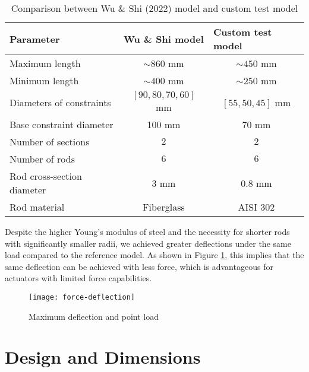 \begin{table}[h]
    \centering
    \caption{Comparison between Wu \& Shi (2022) model and custom test model}
    \label{tab:comparison}
    \begin{tabular}{lcc}
    \toprule
    Parameter                  & \multicolumn{1}{l}{Wu \& Shi model \cite{wu2022}} & \multicolumn{1}{l}{Custom test model} \\ \midrule
    Maximum length             & $\sim860$ mm                     & $\sim450$ mm                       \\
    Minimum length             & $\sim400$ mm                     & $\sim250$ mm                        \\
    Diameters of constraints   & $[90, 80, 70, 60]$ mm               & $[55, 50, 45]$ mm                     \\
    Base constraint diameter   & 100 mm                              & 70 mm                                 \\
    Number of sections         & $2$                                 & $2$                                   \\
    Number of rods             & $6$                                 & $6$                                   \\
    Rod cross-section diameter & $3$ mm                              & $0.8$ mm                              \\
    Rod material               & Fiberglass                          & AISI 302                              \\ \bottomrule
    \end{tabular}
\end{table}

Despite the higher Young's modulus of steel and the necessity for shorter rods with significantly smaller radii, we achieved greater deflections under the same load compared to the reference model. As shown in Figure \ref{fig:force-deflection}, this implies that the same deflection can be achieved with less force, which is advantageous for actuators with limited force capabilities.

\begin{figure}
    \centering
    \texttt{[image: force-deflection]}
    \caption{Maximum deflection and point load}
    \label{fig:force-deflection}
\end{figure}

\section{Design and Dimensions}

